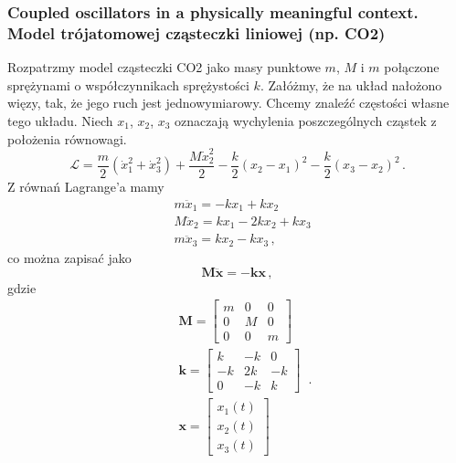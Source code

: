 \documentclass[../main.tex]{subfiles}
\begin{document}
        \subsubsection*{Coupled oscillators in a physically meaningful context. Model trójatomowej cząsteczki liniowej (np. CO2)}
        Rozpatrzmy model cząsteczki CO2 jako masy punktowe \(m\), \(M\) i \(m\) połączone sprężynami o współczynnikach sprężystości \(k\). Załóżmy, że na układ nałożono więzy, tak, że jego ruch jest jednowymiarowy. Chcemy znaleźć częstości własne tego układu. Niech \(x_1\), \(x_2\), \(x_3\) oznaczają wychylenia poszczególnych cząstek z położenia równowagi.
        \begin{equation*}
            \mathcal{L}=\frac{m}{2}(\dot{x}_1^2+\dot{x}_3^2)+\frac{M\dot{x}_2^2}{2}-\frac{k}{2}(x_2-x_1)^2-\frac{k}{2}(x_3-x_2)^2\,.
        \end{equation*}
        Z równań Lagrange'a mamy
        \begin{equation*}
        \begin{split}
            &m\ddot x_1=-kx_1+kx_2\\
            &M\ddot x_2=kx_1-2kx_2+kx_3\\
            &m\ddot x_3=kx_2-kx_3\,,
        \end{split}
        \end{equation*}
        co można zapisać jako
        \begin{equation*}
            \mathbf{M}\ddot{\mathbf{x}}=-\mathbf{k}\mathbf{x}\,,
        \end{equation*}
        gdzie
        \begin{equation*}
        \begin{split}
            &\mathbf{M}=\begin{bmatrix}m&0&0\\0&M&0\\0&0&m\end{bmatrix}\\
            &\mathbf{k}=\begin{bmatrix}k&-k&0\\-k&2k&-k\\0&-k&k\end{bmatrix}\\
            &\mathbf{x}=\begin{bmatrix}x_1(t)\\x_2(t)\\x_3(t)\end{bmatrix}\\
        \end{split}\,.
        \end{equation*}
\end{document}
